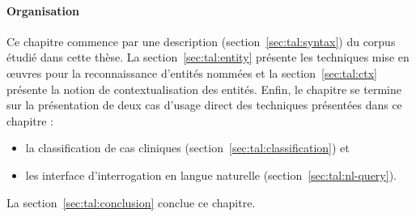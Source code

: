 \paragraph{Organisation}
Ce chapitre commence par une description (section~\ref{sec:tal:syntax}) du corpus étudié dans cette thèse.
La section~\ref{sec:tal:entity} présente les techniques mise en œuvres pour la reconnaissance d'entités nommées et la section~\ref{sec:tal:ctx} présente la notion de contextualisation des entités.
Enfin, le chapitre se termine sur la présentation de deux cas d'usage direct des techniques présentées dans ce chapitre :
\begin{itemize}
    \item la classification de cas cliniques (section~\ref{sec:tal:classification}) et
    \item les interface d'interrogation en langue naturelle (section~\ref{sec:tal:nl-query}).
\end{itemize}
La section~\ref{sec:tal:conclusion} conclue ce chapitre.
